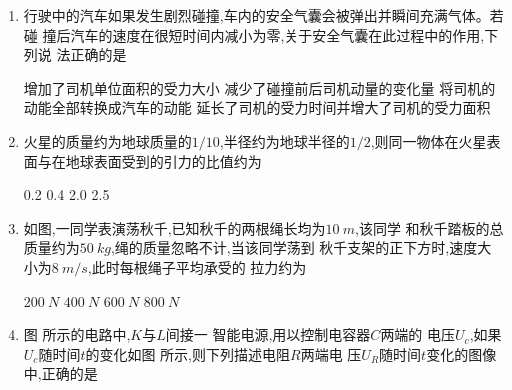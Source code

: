 




\gaokaoxz




\begin{enumerate}
\item
行驶中的汽车如果发生剧烈碰撞,车内的安全气囊会被弹出并瞬间充满气体。若碰
撞后汽车的速度在很短时间内减小为零,关于安全气囊在此过程中的作用,下列说
法正确的是  


\fourchoices
{增加了司机单位面积的受力大小}
{减少了碰撞前后司机动量的变化量}
{将司机的动能全部转换成汽车的动能}
{延长了司机的受力时间并增大了司机的受力面积}





\item 
火星的质量约为地球质量的$ 1/10 $,半径约为地球半径的$ 1/2 $,则同一物体在火星表
面与在地球表面受到的引力的比值约为  

\fourchoices
{0.2}
{0.4}
{2.0}
{2.5}


\item 
如图,一同学表演荡秋千,已知秋千的两根绳长均为$ 10 \ m $,该同学
和秋千踏板的总质量约为$ 50 \ kg $,绳的质量忽略不计,当该同学荡到
秋千支架的正下方时,速度大小为$ 8 \ m/s $,此时每根绳子平均承受的
拉力约为  
\begin{figure}[h!]
\centering
 
\end{figure}



\fourchoices
{$ 200 \ N $}
{$ 400 \ N $}
{$ 600 \ N $}
{$ 800 \ N $}



\item 
图  所示的电路中,$ K $与$ L $间接一
智能电源,用以控制电容器$ C $两端的
电压$ U_{c} $,如果$ U_{c} $随时间$ t $的变化如图
 所示,则下列描述电阻$ R $两端电
压$ U_{R} $随时间$ t $变化的图像中,正确的是  
\begin{figure}[h!]
\centering
\begin{subfigure}{0.4\linewidth}
\centering
 
\caption{}\label{2020-4-a}
\end{subfigure}
\hfil
\begin{subfigure}{0.4\linewidth}
\centering
 
\caption{}\label{2020-4-b}
\end{subfigure}
\end{figure}




\end{enumerate}
